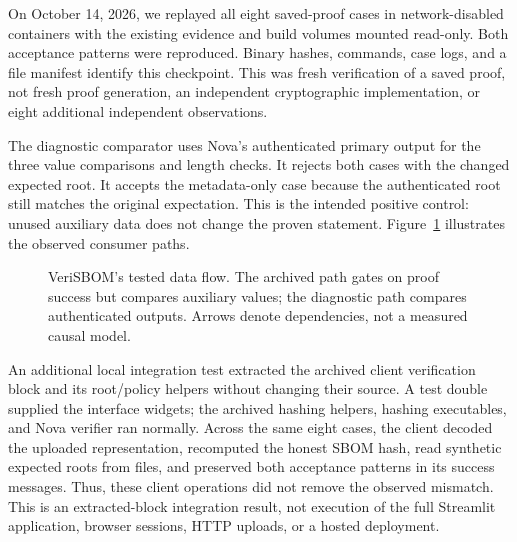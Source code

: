 \documentclass[sigconf,nonacm]{acmart}
\begin{document}
On October 14, 2026, we replayed all eight saved-proof cases in network-disabled containers with the existing evidence and build volumes mounted read-only. Both acceptance patterns were reproduced. Binary hashes, commands, case logs, and a file manifest identify this checkpoint. This was fresh verification of a saved proof, not fresh proof generation, an independent cryptographic implementation, or eight additional independent observations.

The diagnostic comparator uses Nova's authenticated primary output for the three value comparisons and length checks. It rejects both cases with the changed expected root. It accepts the metadata-only case because the authenticated root still matches the original expectation. This is the intended positive control: unused auxiliary data does not change the proven statement. Figure~\ref{fig:flow} illustrates the observed consumer paths.

\begin{figure}[t]
\centering
{}
\caption{VeriSBOM's tested data flow. The archived path gates on proof success but compares auxiliary values; the diagnostic path compares authenticated outputs. Arrows denote dependencies, not a measured causal model.}
\label{fig:flow}
\end{figure}

An additional local integration test extracted the archived client verification block and its root/policy helpers without changing their source. A test double supplied the interface widgets; the archived hashing helpers, hashing executables, and Nova verifier ran normally. Across the same eight cases, the client decoded the uploaded representation, recomputed the honest SBOM hash, read synthetic expected roots from files, and preserved both acceptance patterns in its success messages. Thus, these client operations did not remove the observed mismatch. This is an extracted-block integration result, not execution of the full Streamlit application, browser sessions, HTTP uploads, or a hosted deployment.
\end{document}
